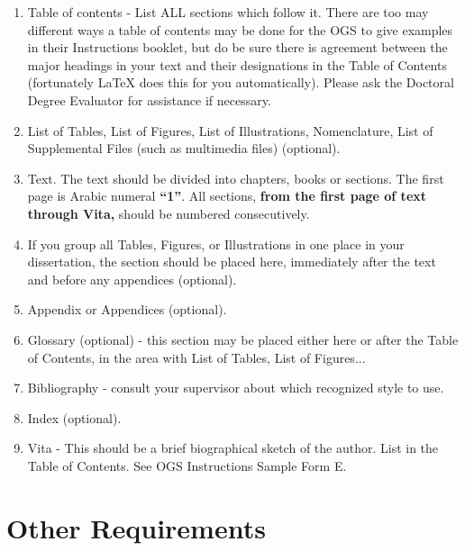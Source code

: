 \begin{enumerate}
\item Table of contents -
%
List ALL sections which follow it. There are too may different ways a table
of contents may be done for the OGS to give examples in their Instructions
booklet, but do be sure there is agreement between the major headings in
your text and their designations in the Table of Contents (fortunately \LaTeX{}
does this for you automatically). Please ask the Doctoral Degree Evaluator
for assistance if necessary.

\item List of Tables,
%
List of Figures,
%
List of Illustrations, 
% 
Nomenclature,
%
List of Supplemental Files (such as multimedia files)
(optional).

\item Text. 
%
The text should be divided into chapters, books or sections. The first page
is Arabic numeral \textbf{``1''}. All sections, \textbf{from the first page
of text through Vita,} should be numbered consecutively.

\item If you group all Tables, 
%
Figures, 
%
or Illustrations 
%
in one place in your dissertation, the section should be placed 
here, immediately after the text and before any appendices 
(optional).

\item Appendix or Appendices 
%
%
(optional).

\item Glossary 
%
(optional) - this section may be placed either here or after the Table
of Contents, in the area with List of Tables, List of Figures...

\item Bibliography
%
- consult your supervisor about which recognized style to use.

\item Index
%
(optional).

\item Vita -
%
This should be a brief biographical sketch of the author. List in the
Table of Contents. See OGS Instructions Sample Form E.


\end{enumerate}


\section{Other Requirements}
%


